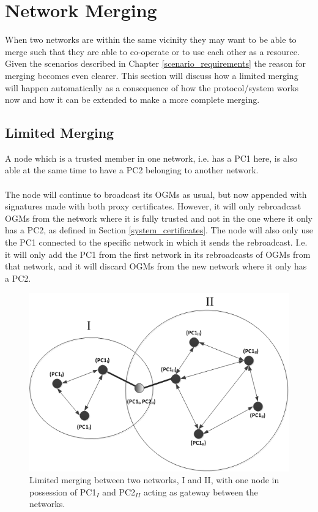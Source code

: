 \section{Network Merging}
When two networks are within the same vicinity they may want to be able to merge such that they are able to co-operate or to use each other as a resource. Given the scenarios described in Chapter \ref{scenario_requirements} the reason for merging becomes even clearer. This section will discuss how a limited merging will happen automatically as a consequence of how the protocol/system works now and how it can be extended to make a more complete merging.

\subsection{Limited Merging}
A node which is a trusted member in one network, i.e. has a PC1 here, is also able at the same time to have a PC2 belonging to another network.
\\\\
The node will continue to broadcast its OGMs as usual, but now appended with signatures made with both proxy certificates. However, it will only rebroadcast OGMs from the network where it is fully trusted and not in the one where it only has a PC2, as defined in Section \ref{system_certificates}. The node will also only use the PC1 connected to the specific network in which it sends the rebroadcast. I.e. it will only add the PC1 from the first network in its rebroadcasts of OGMs from that network, and it will discard OGMs from the new network where it only has a PC2.

\begin{figure}[ht]
	\centering
		\includegraphics{images/limited_merging.png}
	\caption{Limited merging between two networks, I and II, with one node in possession of PC1$_{I}$ and PC2$_{II}$ acting as gateway between the networks.}
	\label{fig:limited_merging}
\end{figure}


